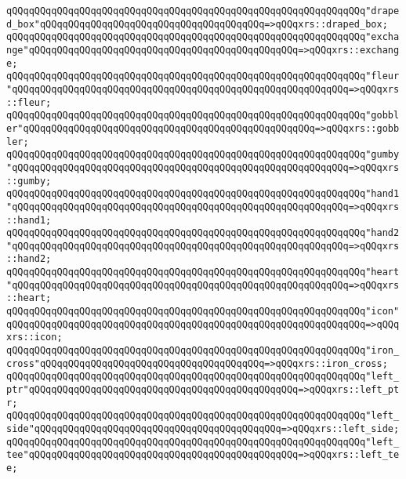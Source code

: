\verb|qQQqqQQqqQQqqQQqqQQqqQQqqQQqqQQqqQQqqQQqqQQqqQQqqQQqqQQqqQQqqQQq"draped_box"qQQqqQQqqQQqqQQqqQQqqQQqqQQqqQQqqQQqqQQq=>qQQqxrs::draped_box;|\newline
\verb|qQQqqQQqqQQqqQQqqQQqqQQqqQQqqQQqqQQqqQQqqQQqqQQqqQQqqQQqqQQqqQQq"exchange"qQQqqQQqqQQqqQQqqQQqqQQqqQQqqQQqqQQqqQQqqQQqqQQq=>qQQqxrs::exchange;|\newline
\verb|qQQqqQQqqQQqqQQqqQQqqQQqqQQqqQQqqQQqqQQqqQQqqQQqqQQqqQQqqQQqqQQq"fleur"qQQqqQQqqQQqqQQqqQQqqQQqqQQqqQQqqQQqqQQqqQQqqQQqqQQqqQQqqQQq=>qQQqxrs::fleur;|\newline
\verb|qQQqqQQqqQQqqQQqqQQqqQQqqQQqqQQqqQQqqQQqqQQqqQQqqQQqqQQqqQQqqQQq"gobbler"qQQqqQQqqQQqqQQqqQQqqQQqqQQqqQQqqQQqqQQqqQQqqQQqqQQq=>qQQqxrs::gobbler;|\newline
\verb|qQQqqQQqqQQqqQQqqQQqqQQqqQQqqQQqqQQqqQQqqQQqqQQqqQQqqQQqqQQqqQQq"gumby"qQQqqQQqqQQqqQQqqQQqqQQqqQQqqQQqqQQqqQQqqQQqqQQqqQQqqQQqqQQq=>qQQqxrs::gumby;|\newline
\verb|qQQqqQQqqQQqqQQqqQQqqQQqqQQqqQQqqQQqqQQqqQQqqQQqqQQqqQQqqQQqqQQq"hand1"qQQqqQQqqQQqqQQqqQQqqQQqqQQqqQQqqQQqqQQqqQQqqQQqqQQqqQQqqQQq=>qQQqxrs::hand1;|\newline
\verb|qQQqqQQqqQQqqQQqqQQqqQQqqQQqqQQqqQQqqQQqqQQqqQQqqQQqqQQqqQQqqQQq"hand2"qQQqqQQqqQQqqQQqqQQqqQQqqQQqqQQqqQQqqQQqqQQqqQQqqQQqqQQqqQQq=>qQQqxrs::hand2;|\newline
\verb|qQQqqQQqqQQqqQQqqQQqqQQqqQQqqQQqqQQqqQQqqQQqqQQqqQQqqQQqqQQqqQQq"heart"qQQqqQQqqQQqqQQqqQQqqQQqqQQqqQQqqQQqqQQqqQQqqQQqqQQqqQQqqQQq=>qQQqxrs::heart;|\newline
\verb|qQQqqQQqqQQqqQQqqQQqqQQqqQQqqQQqqQQqqQQqqQQqqQQqqQQqqQQqqQQqqQQq"icon"qQQqqQQqqQQqqQQqqQQqqQQqqQQqqQQqqQQqqQQqqQQqqQQqqQQqqQQqqQQqqQQq=>qQQqxrs::icon;|\newline
\verb|qQQqqQQqqQQqqQQqqQQqqQQqqQQqqQQqqQQqqQQqqQQqqQQqqQQqqQQqqQQqqQQq"iron_cross"qQQqqQQqqQQqqQQqqQQqqQQqqQQqqQQqqQQqqQQq=>qQQqxrs::iron_cross;|\newline
\verb|qQQqqQQqqQQqqQQqqQQqqQQqqQQqqQQqqQQqqQQqqQQqqQQqqQQqqQQqqQQqqQQq"left_ptr"qQQqqQQqqQQqqQQqqQQqqQQqqQQqqQQqqQQqqQQqqQQqqQQq=>qQQqxrs::left_ptr;|\newline
\verb|qQQqqQQqqQQqqQQqqQQqqQQqqQQqqQQqqQQqqQQqqQQqqQQqqQQqqQQqqQQqqQQq"left_side"qQQqqQQqqQQqqQQqqQQqqQQqqQQqqQQqqQQqqQQqqQQq=>qQQqxrs::left_side;|\newline
\verb|qQQqqQQqqQQqqQQqqQQqqQQqqQQqqQQqqQQqqQQqqQQqqQQqqQQqqQQqqQQqqQQq"left_tee"qQQqqQQqqQQqqQQqqQQqqQQqqQQqqQQqqQQqqQQqqQQqqQQq=>qQQqxrs::left_tee;|\newline
